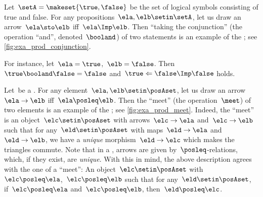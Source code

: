 \begin{marginfigure}
    \centering
    \caption{Taking the conjunction}
    \label{fig:exa_prod_conjunction}
\end{marginfigure}

\begin{example}
    \label{exa:conjunction-as-prod}
    Let~$\setA = \makeset{ \true, \false }$ be the set of logical symbols consisting of true and false.
    For any propositions~$\ela, \elb \setin \setA$, let us draw an arrow~$\ela \sto \elb$ iff~$\ela \Imp \elb$.
    Then ``taking the conjunction'' (the operation ``and'', denoted~$\booland$) of two statements is an example of the ; see \cref{fig:exa_prod_conjunction}.

    For instance, let~$\ela= \true$,~$\elb = \false$.
    Then~$\true \booland \false = \false$ and~$\true \Leftarrow \false \Imp \false$ holds.
\end{example}

\begin{marginfigure}
    \centering
    \caption{Taking the meet}
    \label{fig:exa_prod_meet}
\end{marginfigure}

\begin{example}
    \label{exa:meet-as-prod}
    Let~\posA be a .
    For any element~$\ela, \elb \setin \posAset$, let us draw an arrow~$\ela \to \elb$ iff~$\ela \posleq \elb$.
    Then the ``meet'' (the operation~$\meet$) of two elements is an example of the ; see \cref{fig:exa_prod_meet}.
    Indeed, the ``meet'' is an object~$\elc \setin \posAset$ with arrows~$\elc\to \ela$ and~$\elc \to \elb$ such that for any~$\eld\setin \posAset$ with maps~$\eld\to \ela$ and~$\eld\to \elb$, we have a \emph{unique} morphism~$\eld\to \elc$ which makes the triangles commute.
    Note that in a , arrows are given by~$\posleq$-relations, which, if they exist, are \emph{unique}.
    With this in mind, the above description agrees with the one of a ``meet'':
    An object~$\elc\setin \posAset$ with $\elc\posleq \ela$,~$\elc\posleq \elb$ such that for any~$\eld\setin \posAset$, if~$\elc\posleq \ela$ and~$\elc\posleq \elb$, then~$\eld\posleq \elc$.
\end{example}

\begin{marginfigure}
    \centering
    \caption{}
    \label{fig:prod_generic}
\end{marginfigure}

